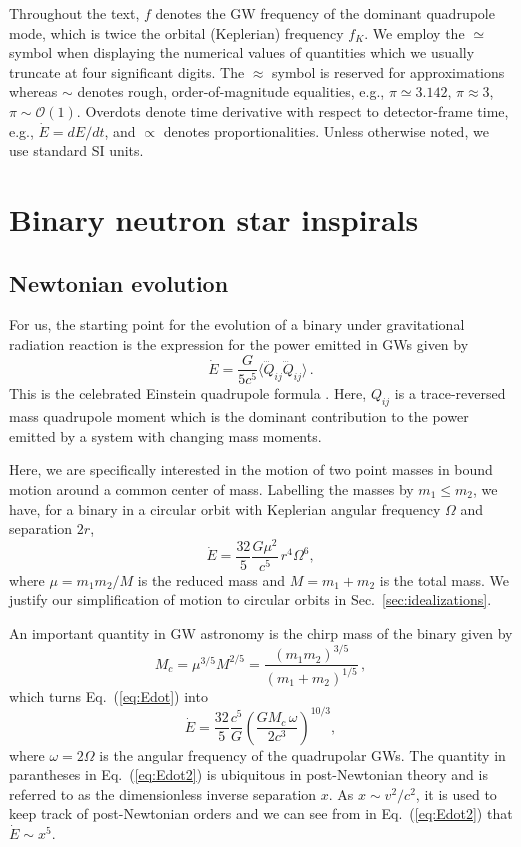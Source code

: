 \documentclass[prd,amsmath,amssymb,aps,floats,amsfonts,notitlepage,superscriptaddress,eqsecnum,nofootinbib,10pt]{revtex4-1}
\newcommand{\ord}{\mathcal{O}}
\newcommand{\f}{\frac}
\newcommand{\be}{\begin{equation}}
\newcommand{\ee}{\end{equation}}
\begin{document}
Throughout the text, $f$ denotes the GW frequency of the dominant quadrupole mode, which is twice the orbital (Keplerian) frequency $f_K$. 
We employ the $\simeq$ symbol when displaying the numerical values of quantities %
which we usually truncate at four significant digits.
The $\approx$ symbol is reserved for approximations whereas $\sim$ denotes rough, order-of-magnitude equalities,
e.g., $\pi \simeq 3.142$, $\pi \approx 3$, $\pi \sim \ord(1)$. %
Overdots denote time derivative with respect to detector-frame time, e.g., $\dot{E} =dE/dt$, and $\propto$ denotes proportionalities. 
Unless otherwise noted, we use standard SI units.

\section{Binary neutron star inspirals}\label{sec:BNS_inspiral}
\subsection{Newtonian evolution}
For us, the starting point for the evolution of a binary under gravitational radiation reaction
is the expression for the power emitted in GWs given by 
%
\be
\dot{E} = \f{G}{5c^5}\langle \dddot{Q}_{ij}\dddot{Q}_{ij} \rangle \label{eq:Edot_quadrupole}\, .
\ee
%
This is the celebrated Einstein quadrupole formula \cite{1918SPAW}. 
Here, $Q_{ij}$ is a trace-reversed mass quadrupole moment which
is the dominant contribution to the power emitted %
by a system with changing mass moments. 

Here, we are specifically interested in the motion of two point masses in bound motion around a common center of mass.
Labelling the masses by $m_1 \le m_2$, we have, for a binary in a circular orbit with Keplerian angular frequency $\Omega$ and separation $2r$,
%
\be
\dot{E} = \f{32}{5}\f{G\mu^2}{c^5}\, r^4 \Omega^6\label{eq:Edot},
\ee
%
where $\mu= m_1 m_2/M$ is the reduced mass and $M=m_1+m_2$ is the total mass. 
We justify our simplification of motion to circular orbits in Sec.~\ref{sec:idealizations}.

An important quantity in GW astronomy is the chirp mass of the binary given by
%
\be
M_c = \mu^{3/5} M^{2/5} = \f{(m_1 m_2)^{3/5}}{(m_1+m_2)^{1/5}} \label{eq:chirp_mass}\, ,
\ee
%
which turns Eq.~(\ref{eq:Edot}) into
%
\be
\dot{E} = \f{32}{5}\f{c^5}{G} \left(\f{G M_c\, \omega}{2c^3}\right)^{10/3}, \label{eq:Edot2}
\ee
%
where $\omega=2\Omega$ is the angular frequency of the quadrupolar GWs. 
The quantity in parantheses in Eq.~(\ref{eq:Edot2}) is ubiquitous in post-Newtonian theory and is
referred to as the dimensionless inverse separation $x$.
As $x\sim v^2/c^2$, it is used to keep track of post-Newtonian orders and we can see from in Eq.~(\ref{eq:Edot2}) that $\dot{E}\sim x^5$. 
\end{document}
